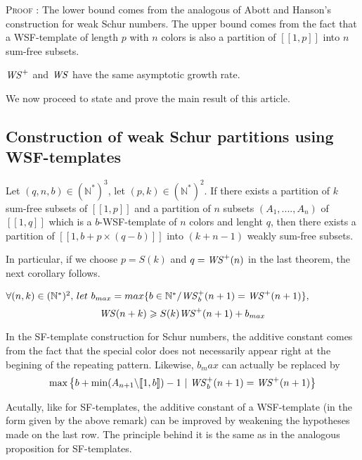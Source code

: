 \textsc{Proof :} The lower bound comes from the analogous of Abott and Hanson's construction for weak Schur numbers.
The upper bound comes from the fact that a WSF-template of length \(p\) with \(n\) colors is also a partition of
\([\![1, p]\!]\) into \(n\) sum-free subsets.

\begin{remark}
	\(\mathit{WS}^+\) and \(\mathit{WS}\) have the same asymptotic growth rate.
\end{remark}

We now proceed to state and prove the main result of this article.


\subsection{Construction of weak Schur partitions using WSF-templates}

\begin{theorem}
Let \((q,n,b) \in (\mathbb{N}^*)^3\), let \( (p,k) \in (\mathbb{N}^*)^2\). If there exists a partition of \(k\)
sum-free subsets of \([\![1,p]\!]\) and a partition of \(n\) subsets \((A_1,....,A_n)\) of \([\![1, q]\!]\) which is a
\(b\)-WSF-template of \(n\) colors and lenght \(q\),
 then there exists a partition of \([\![1, b+p \times (q-b)]\!]\) into \((k+n-1)\) weakly sum-free subsets.
\end{theorem}

In particular, if we choose \(p = S(k)\) and \(q = \mathit{WS}^+(n)\) in the last theorem, the next corollary follows.

\begin{corollary}
\( \forall (n,k) \in (\mathbb{N}^*)^2 \text{, } let ~ b_{max}=max \{b\in \mathbb{N}^*/ \mathit{WS}_b^+(n+1) = \mathit{WS}^+(n+1)\},\) \[
\mathit{WS}(n+k) \geqslant S(k) \mathit{WS}^+(n+1)+b_{max}\]
\end{corollary}

\begin{remark}
In the SF-template construction for Schur numbers, the additive constant comes from the fact that the special color does
not necessarily appear right at the begining of the repeating pattern. Likewise, \(b_max\) can actually be replaced by \\
\[\max \left\{ b + \min (A_{n+1} \backslash [\![1, b ]\!]) - 1~|~ \mathit{WS}_b^+(n+1) = \mathit{WS}^+(n+1) \right\}\]
\end{remark}

\begin{remark}
Acutally, like for SF-templates, the additive constant of a WSF-template (in the form given by the above remark) can be improved
by weakening the hypotheses made on the last row. The principle behind it is the same as in the analogous proposition for SF-templates.
\end{remark}

